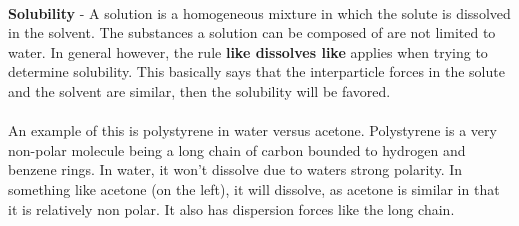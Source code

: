 \documentclass{article}
\begin{document}
	\\
	\textbf{Solubility} - A solution is a homogeneous mixture in which the solute is dissolved in the solvent. The substances a solution can be composed of are not limited to water. In general however, the rule \textbf{like dissolves like} applies when trying to determine solubility. This basically says that the interparticle forces in the solute and the solvent are similar, then the solubility will be favored.\\
	\\
	An example of this is polystyrene in water versus acetone. Polystyrene is a very non-polar molecule being a long chain of carbon bounded to hydrogen and benzene rings. In water, it won't dissolve due to waters strong polarity. In something like acetone (on the left), it will dissolve, as acetone is similar in that it is relatively non polar. It also has dispersion forces like the long chain.
	
	\begin{qq}
		
	
	\begin{center}
		
\hspace{-10pt}\begin{minipage}{10cm}
	
\end{minipage}
\hspace{20pt}\begin{minipage}{3cm}
	


\end{minipage}
	\end{center}
	
	\end{qq}
	
\end{document}
